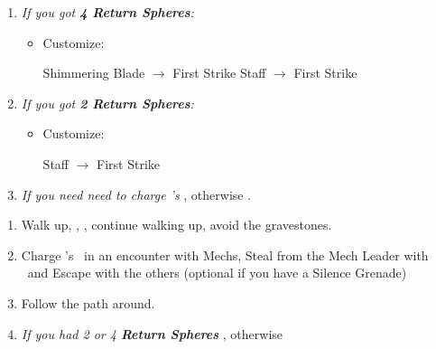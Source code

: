 \colstart
\begin{enumerate}[resume]
    \item \textit{If you got \textbf{4 Return Spheres}:}
        \begin{itemize}
            \item Customize:
                \begin{itemize}
                    \auronf Shimmering Blade $\rightarrow$ First Strike
                    \yunaf Staff $\rightarrow$ First Strike
                \end{itemize}
        \end{itemize}
    \item \textit{If you got \textbf{2 Return Spheres}:}
        \begin{itemize}
            \item Customize:
            \begin{itemize}
                \yunaf Staff $\rightarrow$ First Strike
            \end{itemize}
        \end{itemize}
    \bothvfill
    \winvfill
    \lossvfill
    \item \textit{If you need need to charge \rikku's \od} \formation{\tidus}{\rikku}{\auron}, otherwise \formation{\tidus}{\kimahri}{\wakka}.
\end{enumerate}
\begin{enumerate}[resume]
    \item Walk up, \sd, \cs[1:20], continue walking up, avoid the gravestones.
    \item Charge \rikku's \od\ in an encounter with Mechs, Steal from the Mech Leader with \rikku\ and Escape with the others (optional if you have a Silence Grenade)
    \item Follow the path around.
    \item \textit{If you had 2 or 4 \textbf{Return Spheres}} \formation{\tidus}{\yuna}{\auron}, otherwise \formation{\tidus}{\kimahri}{\wakka}
\end{enumerate}
